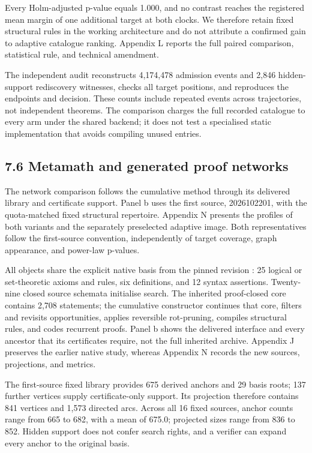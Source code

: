 \documentclass[pdflatex,sn-basic,Numbered]{sn-jnl}
\begin{document}
\endgroup

Every Holm-adjusted p-value equals 1.000, and no contrast reaches the registered mean margin of one additional target at both clocks. We therefore retain fixed structural rules in the working architecture and do not attribute a confirmed gain to adaptive catalogue ranking. Appendix L reports the full paired comparison, statistical rule, and technical amendment.

The independent audit reconstructs 4,174,478 admission events and 2,846 hidden-support rediscovery witnesses, checks all target positions, and reproduces the endpoints and decision. These counts include repeated events across trajectories, not independent theorems. The comparison charges the full recorded catalogue to every arm under the shared backend; it does not test a specialised static implementation that avoids compiling unused entries.

\subsection*{7.6 Metamath and generated proof networks}\label{metamath-and-generated-proof-networks}

The network comparison follows the cumulative method through its delivered library and certificate support. Panel b uses the first source, 2026102201, with the quota-matched fixed structural repertoire. Appendix N presents the profiles of both variants and the separately preselected adaptive image. Both representatives follow the first-source convention, independently of target coverage, graph appearance, and power-law p-values.

All objects share the explicit native basis from the pinned  revision \citep{MetamathSetMMPinned}: 25 logical or set-theoretic axioms and rules, six definitions, and 12 syntax assertions. Twenty-nine closed source schemata initialise search. The inherited proof-closed core contains 2,708 statements; the cumulative constructor continues that core, filters and revisits opportunities, applies reversible rot-pruning, compiles structural rules, and codes recurrent proofs. Panel b shows the delivered interface and every ancestor that its certificates require, not the full inherited archive. Appendix J preserves the earlier native study, whereas Appendix N records the new sources, projections, and metrics.

The first-source fixed library provides 675 derived anchors and 29 basis roots; 137 further vertices supply certificate-only support. Its projection therefore contains 841 vertices and 1,573 directed arcs. Across all 16 fixed sources, anchor counts range from 665 to 682, with a mean of 675.0; projected sizes range from 836 to 852. Hidden support does not confer search rights, and a verifier can expand every anchor to the original basis.
\end{document}
